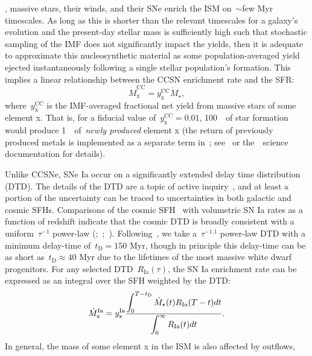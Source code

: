 \documentclass[ms.tex]{subfiles}
\begin{document}
\citep[e.g.][]{Larson1974, Maeder1989, Hurley2000}, massive stars, their winds,
and their SNe enrich the ISM on~$\sim$few Myr timescales.
As long as this is shorter than the relevant timescales for a galaxy's
evolution and the present-day stellar mass is sufficiently high such that
stochastic sampling of the IMF does not significantly impact the yields, then
it is adequate to approximate this nucleosynthetic material as some
population-averaged yield ejected instantaneously following a single stellar
population's formation.
This implies a linear relationship between the CCSN enrichment rate and the
SFR:
\begin{equation}
\dot{M}_\text{x}^\text{CC} = y_\text{x}^\text{CC} \dot{M}_\star,
\end{equation}
where~$y_\text{x}^\text{CC}$ is the IMF-averaged fractional net yield from
massive stars of some element x.
That is, for a fiducial value of~$y_\text{x}^\text{CC} = 0.01$, 100~\msun~of
star formation would produce 1~\msun~of~\textit{newly produced} element x (the
return of previously produced metals is implemented as a separate term
in~\vice; see~\citealt{Johnson2020} or the~\vice~science documentation for
details).
\par
Unlike CCSNe, SNe Ia occur on a significantly extended delay time distribution
(DTD).
The details of the DTD are a topic of active inquiry~\citep[e.g.][]{Greggio2005,
Strolger2020, Freundlich2021}, and at least a portion of the uncertainty can be
traced to uncertainties in both galactic and cosmic SFHs.
Comparisons of the cosmic SFH~\citep[e.g.][]{Hopkins2006, Madau2014, Davies2016,
Madau2017, Driver2018} with volumetric SN Ia rates as a function of redshift
indicate that the cosmic DTD is broadly consistent with a uniform~$\tau^{-1}$
power-law (\citealp{Maoz2012a};~\citealp*{Maoz2012b};~\citealp{Graur2013,
Graur2014}).
Following~\citet{Weinberg2017}, we take a~$\tau^{-1.1}$ power-law DTD with a
minimum delay-time of~$t_\text{D} = 150$ Myr, though in principle this
delay-time can be as short as~$t_\text{D} \approx 40$ Myr due to the lifetimes
of the most massive white dwarf progenitors.
For any selected DTD~$R_\text{Ia}(\tau)$, the SN Ia enrichment rate can be
expressed as an integral over the SFH weighted by the DTD:
\begin{equation}
\dot{M}_\text{x}^\text{Ia} = y_\text{x}^\text{Ia}\frac{\displaystyle{
	\int_0^{T - t_\text{D}} \dot{M}_\star(t) R_\text{Ia}(T - t) dt
}}{\displaystyle{
	\int_0^\infty R_\text{Ia}(t) dt
}}.
\end{equation}
In general, the mass of some element x in the ISM is also affected by outflows,
\end{document}
